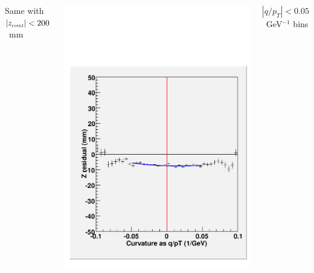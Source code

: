 \documentclass[compress]{beamer}
\begin{document}
\begin{frame}
\begin{columns}
\scriptsize Same with $|z_{\mbox{\tiny resid}}| < 200$~mm

\includegraphics[width=\linewidth]{oprof_whm2_withcut.pdf}

\scriptsize $|q/p_T| < 0.05$~GeV$^{-1}$ bins


\end{columns}
\end{frame}
\end{document}
